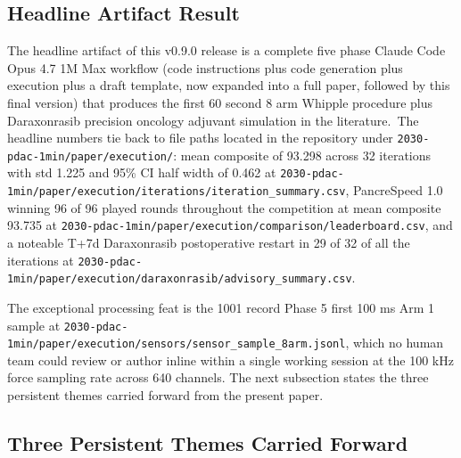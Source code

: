 
\subsection{Headline Artifact Result}
\label{sec:conclusions-headline}

The headline artifact of this v0.9.0 release is a complete five
phase Claude Code Opus 4.7 1M Max workflow (code instructions plus
code generation plus execution plus a draft template, now expanded into a full paper, followed by this final version) that produces the first 60 second 8 arm Whipple procedure plus
Daraxonrasib precision oncology adjuvant simulation in the
literature.\ The headline numbers tie back to file paths located in the repository under
\texttt{2030-pdac-1min/paper/execution/}: mean composite of 93.298
across 32 iterations with std 1.225 and 95\% CI half width of 0.462 at
\texttt{2030-pdac-1min/paper/execution/iterations/iteration_summary.csv},
PancreSpeed 1.0 winning 96 of 96 played rounds throughout the competition at mean composite
93.735 at
\texttt{2030-pdac-1min/paper/execution/comparison/leaderboard.csv},
and a noteable T+7d Daraxonrasib postoperative restart in 29 of 32 of all the iterations at
\texttt{2030-pdac-1min/paper/execution/daraxonrasib/advisory_summary.csv}.

The exceptional processing feat is the 1001 record Phase 5 first
100 ms Arm 1 sample at
\texttt{2030-pdac-1min/paper/execution/sensors/sensor_sample_8arm.jsonl},
which no human team could review or author inline within a single
working session at the 100 kHz force sampling rate across 640
channels. The next subsection states the three persistent themes
carried forward from the present paper.

\subsection{Three Persistent Themes Carried Forward}
\label{sec:conclusions-themes}

